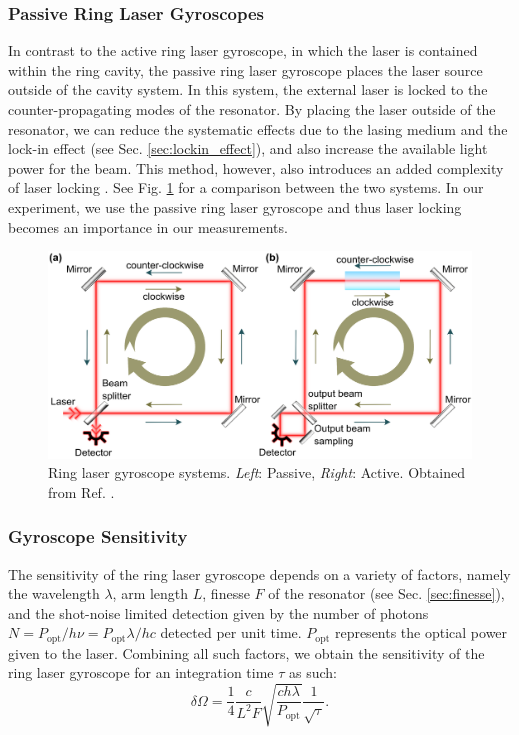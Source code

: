 \documentclass[a4paper]{report}
\numberwithin{equation}{section}
\begin{document}
\subsubsection{Passive Ring Laser Gyroscopes}

In contrast to the active ring laser gyroscope, in which the laser is contained within the ring cavity, the passive ring laser
gyroscope places the laser source outside of the cavity system. In this system, the external laser is locked to the counter-propagating
modes of the resonator. By placing the laser outside of the resonator, we can reduce the systematic effects due to the lasing medium and 
the lock-in effect (see Sec. \ref{sec:lockin_effect}), and also increase the available light power for the beam. 
This method, however, also introduces an added complexity of laser locking \cite{Groh2021}. See Fig. \ref{fig:passive_active} for a comparison between the two
systems. In our experiment, we use the passive ring laser gyroscope and thus laser locking becomes an importance in our measurements.

\begin{figure}[h!]
	\centering
	\includegraphics[width=0.6\columnwidth]{passive_active_gyroscope.png}
	\caption{Ring laser gyroscope systems. \textit{Left}: Passive, \textit{Right}: Active. Obtained from Ref. \cite{Kudelin2021}.}
	\label{fig:passive_active}
\end{figure}

\subsubsection{Gyroscope Sensitivity}

The sensitivity of the ring laser gyroscope depends on a variety of factors, namely the wavelength $\lambda$, arm length $L$, finesse $F$
of the resonator (see Sec. \ref{sec:finesse}), and the shot-noise limited detection given by the number of photons $N = P_{\text{opt}} / h \nu = P_{\text{opt}} \lambda / hc$ detected per unit time. 
$P_{\text{opt}}$ represents the optical power given to the laser. Combining all such factors, we obtain the sensitivity of the ring laser gyroscope for an integration time $\tau$ as such: 
\begin{equation}
	\delta \Omega = \frac{1}{4} \frac{c}{L^2F}\sqrt{\frac{ch\lambda}{P_{\text{opt}}}} \frac{1}{\sqrt{\tau}}.
	\label{eq:gyroscope_sensitivity}
\end{equation}
\end{document}

